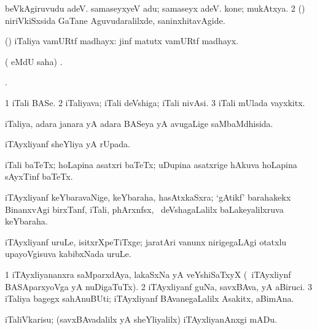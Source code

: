 \noindent 
\gl{\pagu}
\bmng
{} 
\bnum
{}  
\banum
{} beVkAgiruvudu adeV. 
 samaseyxyeV adu; samaseyx adeV. 
 kone; mukAtxya. 
\eanum
\numie
\num{2}  (\AmA) niriVkiSxsida GaTane Aguvudaralilxde, saninxhitavAgide. 
\enum
\emng
\eentry

\bentry
{}
\gl{\nA}
\bmng
(\AmA) iTaliya vamURtf madhayx:  jinf matutx vamURtf madhayx. 
\emng
\eentry

\bentry
{}
\gl{\saMkiSx}
\bmng
( eMdU saha) . 
\emng
\eentry

\bentry
{}
\gl{\saMkiSx}
\bmng
{}. 
\emng
\eentry

\bentry
{}
\gl{\nA}
\bmng
% 
\bnum
\num{1} iTali BASe. 
\num{2} iTaliyava; iTali deVshiga; iTali nivAsi. 
\num{3} iTali mUlada vayxkitx. 
\enum
\emng
\eentry

\bentry
{}
\gl{\gu}
\bmng
iTaliya, adara janara yA adara BASeya yA avugaLige saMbaMdhisida. 
\emng
\eentry

\bentry
{}
\gl{\gu}
\bmng
iTAyxliyanf sheYliya yA rUpada. 
\emng
\eentry

\bentry
{}
\gl{\nA}
\bmng
iTali baTeTx; hoLapina asatxri baTeTx; uDupina asatxrige hAkuva hoLapina sAyxTinf baTeTx. 
\emng
\eentry

\bentry
{}
\gl{\nA}
\bmng
iTAyxliyanf keYbaravaNige, keYbaraha, hasAtxkaSxra; `gAtikf' barahakekx BinanxvAgi birxTanf, iTali, phArxnfsx, \mo\ deVshagaLalilx baLakeyalilxruva keYbaraha. 
\emng
\eentry

\bentry
{}
\gl{\nA}
\bmng
iTAyxliyanf uruLe, isitxrXpeTiTxge; jaratAri \mo vanunx nirigegaLAgi otatxlu upayoVgisuva kabibxNada uruLe. 
\emng
\eentry

\bentry
{}
\gl{\nA}
\bmng
\bnum
\num{1} iTAyxliyananxra saMparxdAya, lakaSxNa yA veYshiSaTxyX (\kanmu\ iTAyxliynf BASAparxyoVga yA nuDigaTuTx). 
\num{2} iTAyxliyanf guNa, savxBAva, yA aBiruci. 
\num{3} iTaliya bagegx sahAnuBUti; iTAyxliyanf BAvanegaLalilx Asakitx, aBimAna. 
\enum
\emng
\eentry

\bentry
{}
\gl{\sakirx}
\bmng
iTaliVkarisu; (savxBAvadalilx yA sheYliyalilx) iTAyxliyanAnxgi mADu. 
\emng
\eentry

